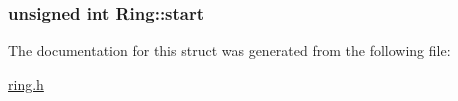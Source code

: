 \subsubsection[{\texorpdfstring{start}{start}}]{\setlength{\rightskip}{0pt plus 5cm}unsigned int Ring\+::start}\hypertarget{structRing_a05ded3e84726b36d0b2266e733ddc61e}{}\label{structRing_a05ded3e84726b36d0b2266e733ddc61e}


The documentation for this struct was generated from the following file\+:\begin{DoxyCompactItemize}
\item 
\hyperlink{ring_8h}{ring.\+h}\end{DoxyCompactItemize}
